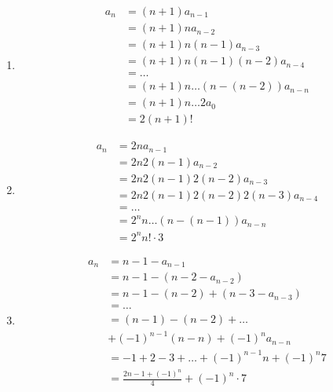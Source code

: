 \documentclass[12pt]{article}
\begin{document}
\begin{multicols}{2}
\begin{enumerate}[label=\alph*)]
          \item %
            \begin{align*}
              a_n &= (n+1)a_{n-1} \\
              &= (n+1)n a_{n-2} \\
              &= (n+1)n(n-1)a_{n-3} \\
              &= (n+1)n(n-1)(n-2)a_{n-4} \\
              &= \dots \\
              &= (n+1)n\dots(n-(n-2))a_{n-n} \\
              &= (n+1)n\dots2 a_0 \\
              &= 2(n+1)!
            \end{align*}

          \item %
            \begin{align*}
              a_n &= 2na_{n-1} \\
              &= 2n2(n-1)a_{n-2} \\
              &= 2n2(n-1)2(n-2)a_{n-3} \\
              &= 2n2(n-1)2(n-2)2(n-3)a_{n-4} \\
              &= \dots \\
              &= 2^n n\dots(n-(n-1))a_{n-n}\\
              &= 2^n n!\cdot3
            \end{align*}
          
          \item %
            \begin{align*}
              a_n &= n-1 - a_{n-1} \\
              &= n-1 - (n-2 - a_{n-2}) \\
              &= n-1 - (n-2) + (n-3 - a_{n-3}) \\
              &= \dots \\
              &= (n-1) - (n-2) + \dots \\
              &+ (-1)^{n-1}(n-n) + (-1)^n a_{n-n} \\
              &= -1 + 2 -3 + \dots +(-1)^{n-1} n + (-1)^n7 \\
              &= \frac{2n-1+(-1)^n}{4} + (-1)^n\cdot 7
            \end{align*}
        \end{enumerate}


\end{multicols}
\end{document}
